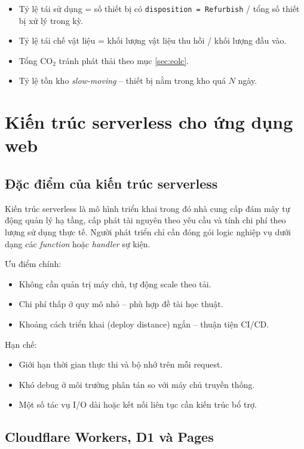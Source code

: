 \begin{itemize}[leftmargin=1.2cm]
    \item Tỷ lệ tái sử dụng = số thiết bị có \texttt{disposition = Refurbish} / tổng số thiết bị xử lý trong kỳ.
    \item Tỷ lệ tái chế vật liệu = khối lượng vật liệu thu hồi / khối lượng đầu vào.
    \item Tổng CO$_2$ tránh phát thải theo mục \ref{sec:eolc}.
    \item Tỷ lệ tồn kho \emph{slow-moving} -- thiết bị nằm trong kho quá $N$ ngày.
\end{itemize}

\section{Kiến trúc serverless cho ứng dụng web}
\label{sec:serverless}

\subsection{Đặc điểm của kiến trúc serverless}
Kiến trúc serverless là mô hình triển khai trong đó nhà cung cấp đám mây tự động quản lý hạ tầng, cấp phát tài nguyên theo yêu cầu và tính chi phí theo lượng sử dụng thực tế. Người phát triển chỉ cần đóng gói logic nghiệp vụ dưới dạng các \emph{function} hoặc \emph{handler} sự kiện.

Ưu điểm chính:
\begin{itemize}[leftmargin=1.2cm]
    \item Không cần quản trị máy chủ, tự động scale theo tải.
    \item Chi phí thấp ở quy mô nhỏ -- phù hợp đề tài học thuật.
    \item Khoảng cách triển khai (deploy distance) ngắn -- thuận tiện CI/CD.
\end{itemize}

Hạn chế:
\begin{itemize}[leftmargin=1.2cm]
    \item Giới hạn thời gian thực thi và bộ nhớ trên mỗi request.
    \item Khó debug ở môi trường phân tán so với máy chủ truyền thống.
    \item Một số tác vụ I/O dài hoặc kết nối liên tục cần kiến trúc bổ trợ.
\end{itemize}

\subsection{Cloudflare Workers, D1 và Pages}
